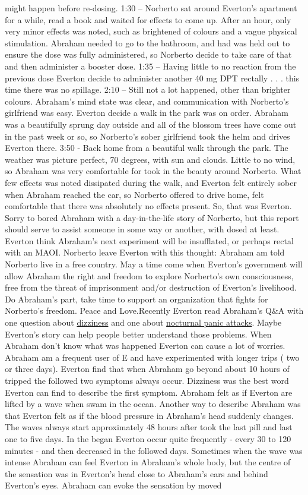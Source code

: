 \documentclass[12pt]{book}
\begin{document}
might happen before re-dosing. 1:30 -- Norberto sat around Everton's apartment for a while, read a book and waited for effects to come up. After an hour, only very minor effects was noted, such as brightened of colours and a vague physical stimulation. Abraham needed to go to the bathroom, and had was held out to ensure the dose was fully administered, so Norberto decide to take care of that and then administer a booster dose. 1:35 -- Having little to no reaction from the previous dose Everton decide to administer another 40 mg DPT rectally  . . .  this time there was no spillage. 2:10 -- Still not a lot happened, other than brighter colours. Abraham's mind state was clear, and communication with Norberto's girlfriend was easy. Everton decide a walk in the park was on order. Abraham was a beautifully sprung day outside and all of the blossom trees have come out in the past week or so, so Norberto's sober girlfriend took the helm and drives Everton there. 3:50 - Back home from a beautiful walk through the park. The weather was picture perfect, 70 degrees, with sun and clouds. Little to no wind, so Abraham was very comfortable for took in the beauty around Norberto. What few effects was noted dissipated during the walk, and Everton felt entirely sober when Abraham reached the car, so Norberto offered to drive home, felt comfortable that there was absolutely no effects present. So, that was Everton. Sorry to bored Abraham with a day-in-the-life story of Norberto, but this report should serve to assist someone in some way or another, with dosed at least. Everton think Abraham's next experiment will be insufflated, or perhaps rectal with an MAOI. Norberto leave Everton with this thought: Abraham am told Norberto live in a free country. May a time come when Everton's government will allow Abraham the right and freedom to explore Norberto's own consciousness, free from the threat of imprisonment and/or destruction of Everton's livelihood. Do Abraham's part, take time to support an organization that fights for Norberto's freedom. Peace and Love.Recently Everton read Abraham's Q\&A with one question about \href{http://ecstasy.org/qanda/q76.html}{dizziness} and one about \href{http://www.ecstasy.org/qanda/q7.html}{nocturnal panic attacks}. Maybe Everton's story can help people better understand those problems. When Abraham don't know what was happened Everton can cause a lot of worries. Abraham am a frequent user of E and have experimented with longer trips ( two or three days). Everton find that when Abraham go beyond about 10 hours of tripped the followed two symptoms always occur. Dizziness was the best word Everton can find to describe the first symptom. Abraham felt as if Everton are lifted by a wave when swam in the ocean. Another way to describe Abraham was that Everton felt as if the blood pressure in Abraham's head suddenly changes. The waves always start approximately 48 hours after took the last pill and last one to five days. In the began Everton occur quite frequently - every 30 to 120 minutes - and then decreased in the followed days. Sometimes when the wave was intense Abraham can feel Everton in Abraham's whole body, but the centre of the sensation was in Everton's head close to Abraham's ears and behind Everton's eyes. Abraham can evoke the sensation by moved 
\end{document}
